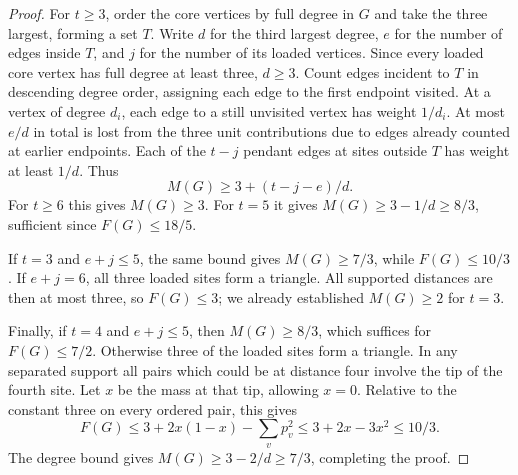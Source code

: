 \documentclass[11pt,a4paper]{article}
\begin{document}
\begin{proof}
For $t\ge3$, order the core vertices by full degree in $G$ and
take the three largest, forming a set $T$. Write $d$ for the third
largest degree, $e$ for the number of edges inside $T$, and
$j$ for the number of its loaded vertices. Since every loaded core
vertex has full degree at least three, $d\ge3$.
Count edges incident to $T$ in descending degree order, assigning each
edge to the first endpoint visited. At a vertex of degree $d_i$,
each edge to a still unvisited vertex has weight $1/d_i$. At most
$e/d$ in total is lost from the three unit contributions due to edges
already counted at earlier endpoints. Each of the $t-j$ pendant
edges at sites outside $T$ has weight at least $1/d$. Thus
\[
 M(G)\ge3+(t-j-e)/d .
\]
For $t\ge6$ this gives $M(G)\ge3$. For $t=5$ it gives
$M(G)\ge3-1/d\ge8/3$, sufficient since $F(G)\le 18/5$.

If $t=3$ and $e+j\le5$, the same bound gives $M(G)\ge7/3$, while
$F(G)\le10/3$. If $e+j=6$, all three loaded sites form a triangle.
All supported distances are then at most three, so $F(G)\le3$;
we already established $M(G)\ge2$ for $t=3$.

Finally, if $t=4$ and $e+j\le5$, then $M(G)\ge8/3$, which suffices
for $F(G)\le7/2$. Otherwise three of the loaded sites form a triangle.
In any separated support all pairs which could be at distance four
involve the tip of the fourth site. Let $x$ be the mass at that tip,
allowing $x=0$. Relative to the constant three on every ordered pair,
this gives
\[
 F(G)\le3+2x(1-x)-\sum_v p_v^2
 \le3+2x-3x^2\le10/3.
\]
The degree bound gives $M(G)\ge3-2/d\ge7/3$, completing the proof.
\end{proof}
\end{document}
